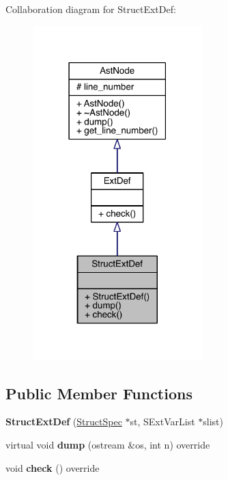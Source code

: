 Collaboration diagram for Struct\+Ext\+Def\+:\nopagebreak
\begin{figure}[H]
\begin{center}
\leavevmode
\includegraphics[width=186pt]{class_struct_ext_def__coll__graph}
\end{center}
\end{figure}
\subsection*{Public Member Functions}
\begin{DoxyCompactItemize}
\item 
\mbox{\label{class_struct_ext_def_aa5d2a48a60a50596627ad52bdf5099b5}} 
{\bfseries Struct\+Ext\+Def} (\hyperlink{class_struct_spec}{Struct\+Spec} $\ast$st, S\+Ext\+Var\+List $\ast$slist)
\item 
\mbox{\label{class_struct_ext_def_abae4ce32fa80590d46598e210ffd2350}} 
virtual void {\bfseries dump} (ostream \&os, int n) override
\item 
\mbox{\label{class_struct_ext_def_ac518c458ea78fa240de2ee9db61c22f9}} 
void {\bfseries check} () override
\end{DoxyCompactItemize}
